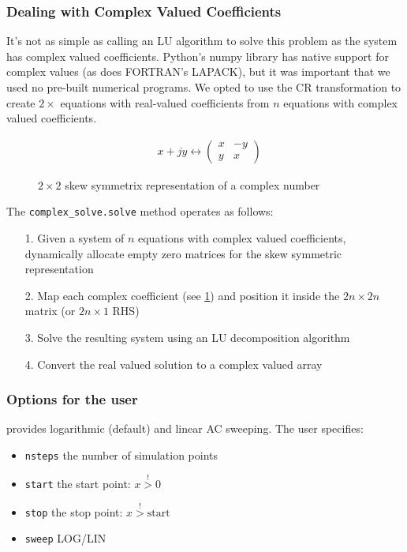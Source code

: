 \subsubsection{Dealing with Complex Valued Coefficients}
 It's not as simple as calling an LU algorithm to solve this problem as the system has complex valued coefficients. Python's numpy library has native support for complex values (as does FORTRAN's LAPACK), but it was important that we used no pre-built numerical programs. We opted to use the CR transformation to create $2\times$ equations with real-valued coefficients from $n$ equations with complex valued coefficients\cite{ercegovac_muller_2007}.\\
 
 \begin{figure}[!h]
     \centering
     \begin{align*}
     &x+jy \leftrightarrow
     \begin{pmatrix}
     x & -y \\
     y & x
     \end{pmatrix}
    \end{align*}
     \caption{$2\times 2$ skew symmetrix representation of a complex number}
     \label{fig:complex rep}
 \end{figure}
 
The \texttt{complex\_solve.solve} method operates as follows:
\begin{enumerate}
    \item[1.] Given a system of $n$ equations with complex valued coefficients, dynamically allocate empty zero matrices for the skew symmetric representation
    \item[2.] Map each complex coefficient (see \cref{fig:complex rep}) and position it inside the $2n \times 2n$ matrix (or $2n \times 1$ RHS)
    \item[3.] Solve the resulting system using an LU decomposition algorithm
    \item[4.] Convert the real valued solution to a complex valued array
\end{enumerate}

\subsubsection{Options for the user}
\turmeric provides logarithmic (default) and linear AC sweeping. The user specifies:
\begin{itemize}
    \item \texttt{nsteps} the number of simulation points
    \item \texttt{start} the start point: $x \overset{!}{>} 0$
    \item \texttt{stop} the stop point: $x \overset{!}{>} \text{start}$
    \item \texttt{sweep} LOG/LIN
\end{itemize}

